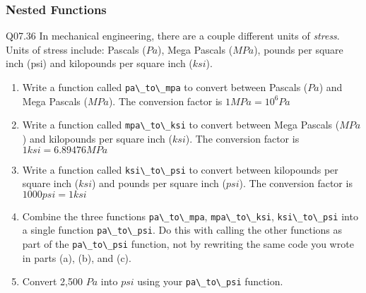 \documentclass{book}
\newenvironment{problems}{}{}  %
\newcommand{\passthrough}[1]{#1}
\begin{document}
    
        \begin{problems}
        \hypertarget{nested-functions}{%
\subsubsection{Nested Functions}\label{nested-functions}}

Q07.36 In mechanical engineering, there are a couple different units of
\emph{stress}. Units of stress include: Pascals (\(Pa\)), Mega Pascals
(\(MPa\)), pounds per square inch (psi) and kilopounds per square inch
(\(ksi\)).

\begin{enumerate}
\def\labelenumi{(\alph{enumi})}
\item
  Write a function called \passthrough{\lstinline!pa\_to\_mpa!} to
  convert between Pascals (\(Pa\)) and Mega Pascals (\(MPa\)). The
  conversion factor is \(1 MPa = 10^6 Pa\)
\item
  Write a function called \passthrough{\lstinline!mpa\_to\_ksi!} to
  convert between Mega Pascals (\(MPa\)) and kilopounds per square inch
  (\(ksi\)). The conversion factor is \(1 ksi = 6.89476 MPa\)
\item
  Write a function called \passthrough{\lstinline!ksi\_to\_psi!} to
  convert between kilopounds per square inch (\(ksi\)) and pounds per
  square inch (\(psi\)). The conversion factor is \(1000 psi = 1 ksi\)
\item
  Combine the three functions \passthrough{\lstinline!pa\_to\_mpa!},
  \passthrough{\lstinline!mpa\_to\_ksi!},
  \passthrough{\lstinline!ksi\_to\_psi!} into a single function
  \passthrough{\lstinline!pa\_to\_psi!}. Do this with calling the other
  functions as part of the \passthrough{\lstinline!pa\_to\_psi!}
  function, not by rewriting the same code you wrote in parts (a), (b),
  and (c).
\item
  Convert 2,500 \(Pa\) into \(psi\) using your
  \passthrough{\lstinline!pa\_to\_psi!} function.
\end{enumerate}
        \end{problems}

    
\end{document}
